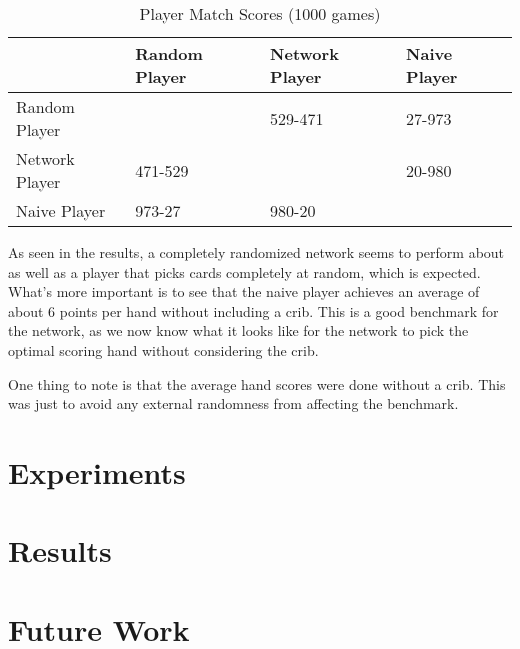 \documentclass[]{article}
\begin{document}
\begin{table}[ht]
    \caption {Player Match Scores (1000 games)} \label{tbl:match_scores}
    \begin{tabular}{l|l|l|l|}
    \cline{2-4}
                                         & Random Player                                   & Network Player           & Naive Player             \\ \hline
    \multicolumn{1}{|l|}{Random Player}  & \cellcolor[HTML]{000000}                        & 529-471                  & 27-973                   \\ \hline
    \multicolumn{1}{|l|}{Network Player} & 471-529                                         & \cellcolor[HTML]{000000} & 20-980                   \\ \hline
    \multicolumn{1}{|l|}{Naive Player}   & 973-27                                          & 980-20                   & \cellcolor[HTML]{000000} \\ \hline
    \end{tabular}
\end{table}

As seen in the results, a completely randomized network seems to perform about as well as a player that picks cards completely at random, which is expected. What's more important is to see that the naive player achieves an average of about 6 points per hand without including a crib. This is a good benchmark for the network, as we now know what it looks like for the network to pick the optimal scoring hand without considering the crib.

One thing to note is that the average hand scores were done without a crib. This was just to avoid any external randomness from affecting the benchmark.

\section{Experiments}

\section{Results}

\section{Future Work}





\end{document}
